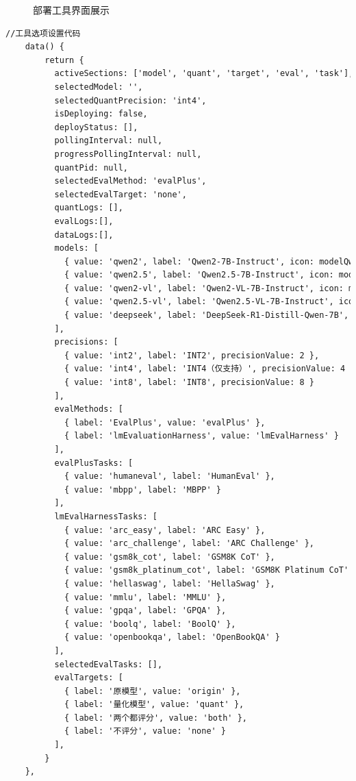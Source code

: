 \documentclass[AutoFakeBold,AutoFakeSlant,language=chinese,degree=bachelor]{sustechthesis}
\begin{document}
\begin{itemize}
\begin{figure}[H]
            \caption{部署工具界面展示}
        \end{figure}
        \begin{lstlisting}[language=HTML]
        //工具选项设置代码
    data() {
        return {
          activeSections: ['model', 'quant', 'target', 'eval', 'task'],
          selectedModel: '',
          selectedQuantPrecision: 'int4',
          isDeploying: false,
          deployStatus: [],
          pollingInterval: null,
          progressPollingInterval: null,
          quantPid: null,
          selectedEvalMethod: 'evalPlus',
          selectedEvalTarget: 'none',
          quantLogs: [],
          evalLogs:[],
          dataLogs:[],
          models: [
            { value: 'qwen2', label: 'Qwen2-7B-Instruct', icon: modelQwen },
            { value: 'qwen2.5', label: 'Qwen2.5-7B-Instruct', icon: modelQwen },
            { value: 'qwen2-vl', label: 'Qwen2-VL-7B-Instruct', icon: modelQwen },
            { value: 'qwen2.5-vl', label: 'Qwen2.5-VL-7B-Instruct', icon: modelQwen },
            { value: 'deepseek', label: 'DeepSeek-R1-Distill-Qwen-7B', icon: modelDeepseek }
          ],
          precisions: [
            { value: 'int2', label: 'INT2', precisionValue: 2 },
            { value: 'int4', label: 'INT4（仅支持）', precisionValue: 4 },
            { value: 'int8', label: 'INT8', precisionValue: 8 }
          ],
          evalMethods: [
            { label: 'EvalPlus', value: 'evalPlus' },
            { label: 'lmEvaluationHarness', value: 'lmEvalHarness' }
          ],
          evalPlusTasks: [
            { value: 'humaneval', label: 'HumanEval' },
            { value: 'mbpp', label: 'MBPP' }
          ],
          lmEvalHarnessTasks: [
            { value: 'arc_easy', label: 'ARC Easy' },
            { value: 'arc_challenge', label: 'ARC Challenge' },
            { value: 'gsm8k_cot', label: 'GSM8K CoT' },
            { value: 'gsm8k_platinum_cot', label: 'GSM8K Platinum CoT' },
            { value: 'hellaswag', label: 'HellaSwag' },
            { value: 'mmlu', label: 'MMLU' },
            { value: 'gpqa', label: 'GPQA' },
            { value: 'boolq', label: 'BoolQ' },
            { value: 'openbookqa', label: 'OpenBookQA' }
          ],
          selectedEvalTasks: [],
          evalTargets: [
            { label: '原模型', value: 'origin' },
            { label: '量化模型', value: 'quant' },
            { label: '两个都评分', value: 'both' },
            { label: '不评分', value: 'none' }
          ],
        }
    },
        \end{lstlisting}
        

\end{itemize}
\end{document}
